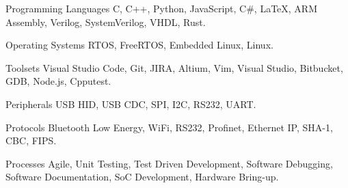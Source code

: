 


\begin{cvskills}


\cvskill
{Programming Languages} %
{C, C++, Python, JavaScript, C\#, LaTeX, ARM Assembly, Verilog, SystemVerilog, VHDL, Rust.} %


\cvskill
{Operating Systems} %
{RTOS, FreeRTOS, Embedded Linux, Linux.} %


\cvskill
{Toolsets} %
{Visual Studio Code, Git, JIRA, Altium, Vim, Visual Studio, Bitbucket, GDB, Node.js, Cpputest.} %


\cvskill
{Peripherals} %
{USB HID, USB CDC, SPI, I2C, RS232, UART.} %


\cvskill
{Protocols} %
{Bluetooth Low Energy, WiFi, RS232, Profinet, Ethernet IP, SHA-1, CBC, FIPS.} %


\cvskill
{Processes} %
{Agile, Unit Testing, Test Driven Development, Software Debugging, Software Documentation, \newline SoC Development, Hardware Bring-up.} %


\end{cvskills}